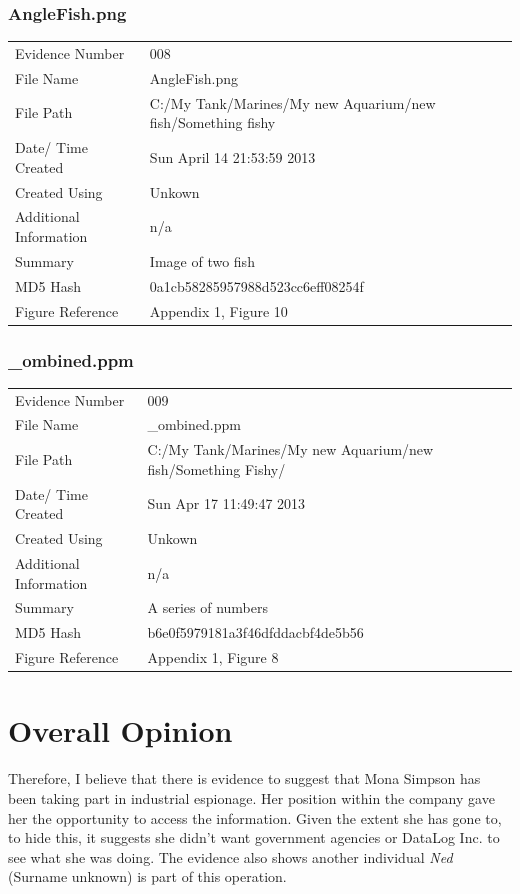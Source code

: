 \documentclass[12pt]{article}
\begin{document}
				\subsubsection{AngleFish.png}
					\begin{tabular}{l | p{8cm}}
						Evidence Number & 008  \\
			    			File Name & AngleFish.png \\
			      			File Path & C:/My Tank/Marines/My new Aquarium/new fish/Something fishy  \\
						Date/ Time Created & Sun April 14 21:53:59 2013 \\
						Created Using & Unkown \\
						Additional Information & n/a \\
						Summary & Image of two fish\\
						MD5 Hash & 0a1cb58285957988d523cc6eff08254f \\
						Figure Reference &  Appendix 1, Figure 10\\
					\end{tabular}

				\subsubsection{\_ombined.ppm}
					\begin{tabular}{l | p{8cm}}
						Evidence Number & 009  \\
			    			File Name & \_ombined.ppm \\
			      			File Path & C:/My Tank/Marines/My new Aquarium/new fish/Something Fishy/  \\
						Date/ Time Created & Sun Apr 17 11:49:47 2013 \\
						Created Using & Unkown \\
						Additional Information & n/a \\
						Summary & A series of numbers\\
						MD5 Hash & b6e0f5979181a3f46dfddacbf4de5b56 \\
						Figure Reference &  Appendix 1, Figure 8\\
					\end{tabular}

		\section{Overall Opinion}

			Therefore, I believe that there is evidence to suggest that Mona Simpson has been taking part in industrial espionage. Her position within the company gave her the opportunity to access the information. Given the extent she has gone to, to hide this, it suggests she didn't want government agencies or DataLog Inc. to see what she was doing. The evidence also shows another individual \textit{Ned} (Surname unknown) is part of this operation.
\end{document}
